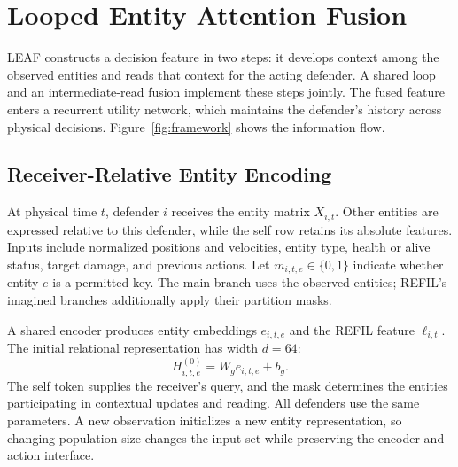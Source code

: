 \section{Looped Entity Attention Fusion}
\label{sec:method}
LEAF constructs a decision feature in two steps: it develops context among the observed entities and reads that context for the acting defender. A shared loop and an intermediate-read fusion implement these steps jointly. The fused feature enters a recurrent utility network, which maintains the defender's history across physical decisions. Figure~\ref{fig:framework} shows the information flow.

\subsection{Receiver-Relative Entity Encoding}
At physical time $t$, defender $i$ receives the entity matrix $X_{i,t}$. Other entities are expressed relative to this defender, while the self row retains its absolute features. Inputs include normalized positions and velocities, entity type, health or alive status, target damage, and previous actions. Let $m_{i,t,e}\in\{0,1\}$ indicate whether entity $e$ is a permitted key. The main branch uses the observed entities; REFIL's imagined branches additionally apply their partition masks.

A shared encoder produces entity embeddings $e_{i,t,e}$ and the REFIL feature $\ell_{i,t}$. The initial relational representation has width $d=64$:
\begin{equation}
 H^{(0)}_{i,t,e}=W_g e_{i,t,e}+b_g.
 \label{eq:workspace}
\end{equation}
The self token supplies the receiver's query, and the mask determines the entities participating in contextual updates and reading. All defenders use the same parameters. A new observation initializes a new entity representation, so changing population size changes the input set while preserving the encoder and action interface.

